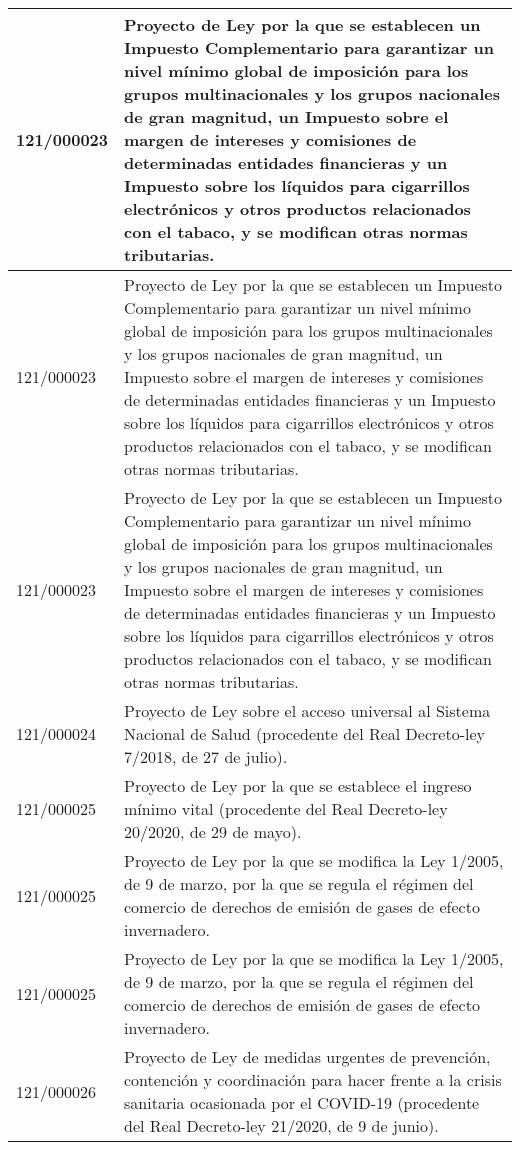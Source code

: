 {\begin{table}[H]
\begin{center}
\begin{tabularx}{\linewidth}{| l | X |}
\hline
121/000023 & Proyecto de Ley por la que se establecen un Impuesto Complementario para garantizar un nivel mínimo global de imposición para los grupos multinacionales y los grupos nacionales de gran magnitud, un Impuesto sobre el margen de intereses y comisiones de determinadas entidades financieras y un Impuesto sobre los líquidos para cigarrillos electrónicos y otros productos relacionados con el tabaco, y se modifican otras normas tributarias. \\
\hline
121/000023 & Proyecto de Ley por la que se establecen un Impuesto Complementario para garantizar un nivel mínimo global de imposición para los grupos multinacionales y los grupos nacionales de gran magnitud, un Impuesto sobre el margen de intereses y comisiones de determinadas entidades financieras y un Impuesto sobre los líquidos para cigarrillos electrónicos y otros productos relacionados con el tabaco, y se modifican otras normas tributarias. \\
\hline
121/000023 & Proyecto de Ley por la que se establecen un Impuesto Complementario para garantizar un nivel mínimo global de imposición para los grupos multinacionales y los grupos nacionales de gran magnitud, un Impuesto sobre el margen de intereses y comisiones de determinadas entidades financieras y un Impuesto sobre los líquidos para cigarrillos electrónicos y otros productos relacionados con el tabaco, y se modifican otras normas tributarias. \\
\hline
121/000024 & Proyecto de Ley sobre el acceso universal al Sistema Nacional de Salud (procedente del Real Decreto-ley 7/2018, de 27 de julio). \\
\hline
121/000025 & Proyecto de Ley por la que se establece el ingreso mínimo vital (procedente del Real Decreto-ley 20/2020, de 29 de mayo). \\
\hline
121/000025 & Proyecto de Ley por la que se modifica la Ley 1/2005, de 9 de marzo, por la que se regula el régimen del comercio de derechos de emisión de gases de efecto invernadero. \\
\hline
121/000025 & Proyecto de Ley por la que se modifica la Ley 1/2005, de 9 de marzo, por la que se regula el régimen del comercio de derechos de emisión de gases de efecto invernadero. \\
\hline
121/000026 & Proyecto de Ley de medidas urgentes de prevención, contención y coordinación para hacer frente a la crisis sanitaria ocasionada por el COVID-19 (procedente del Real Decreto-ley 21/2020, de 9 de junio). \\

\end{tabularx}
\end{center}
\end{table}}

